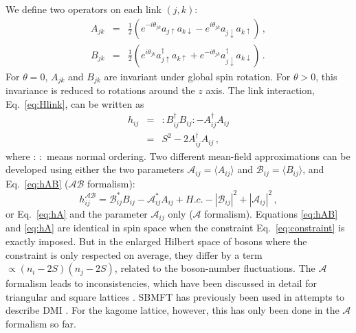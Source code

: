 \documentclass[aps,prl,twocolumn,superscriptaddress,showpacs,a4paper, longbibliography]{revtex4-1}
\begin{document}
We define two operators on each link $(j,k)$:
\begin{eqnarray}
  A_{jk}&=&\frac{1}{2}\left( e^{-i\theta_{jk}}a_{j\uparrow}a_{k\downarrow}- e^{i\theta_{jk}}a_{j\downarrow} a_{k\uparrow} \right)\,,\\
  B_{jk}&=&\frac{1}{2}\left( e^{i\theta_{jk}}a_{j\uparrow}^\dag a_{k\uparrow}+e^{-i\theta_{jk}}a_{j\downarrow}^\dag a_{k\downarrow}\right)\,.
\end{eqnarray}
For $\theta=0$, $A_{jk}$ and $B_{jk}$ are invariant under global spin rotation.
For $\theta> 0$, this invariance is reduced to rotations around the $z$ axis. The link interaction, Eq.~\eqref{eq:Hlink}, can be written as
\begin{eqnarray}
\label{eq:hAB}
  h_{ij}
  &=&
  :B_{ij}^\dag B_{ij}:
  -A_{ij}^\dag A_{ij}
  \\
  \label{eq:hA}
  &=& S^2 - 2 A_{ij}^\dag A_{ij}\,,
\end{eqnarray}
where $:\,:$ means normal ordering.
Two different mean-field approximations can be developed using either the two parameters $\mathcal A_{ij} = \langle A_{ij}\rangle$ and $\mathcal B_{ij} = \langle B_{ij}\rangle$, and Eq.~\eqref{eq:hAB} ($\mathcal A \mathcal B$ formalism):
\begin{equation}
  h_{ij}^{\mathcal A\mathcal B} =
  \mathcal B_{ij}^* B_{ij}
  -\mathcal A_{ij}^* A_{ij}
  +H.c.
  - |\mathcal B_{ij}|^2 + |\mathcal A_{ij}|^2\,,
\end{equation}
or Eq.~\eqref{eq:hA} and the parameter $\mathcal A_{ij}$ only ($\mathcal A$ formalism).
Equations \eqref{eq:hAB} and \eqref{eq:hA} are identical in spin space when the constraint Eq.~\eqref{eq:constraint} is exactly imposed.
But in the enlarged Hilbert space of bosons where the constraint is only respected on average, they differ by a term $\propto (n_i-2S)(n_j-2S)$, related to the boson-number fluctuations.
The $\mathcal A$ formalism leads to inconsistencies, which have been discussed in detail for triangular and square lattices \cite{Symplectic_SBMFT, Trumper_AB_SBMFT}.
SBMFT has previously been used in attempts to describe DMI \cite{Moi_DM, DM_Fritz, DM_SBMFT}.
For the kagome lattice, however, this has only been done in the $\mathcal A$ formalism so far.
\end{document}
